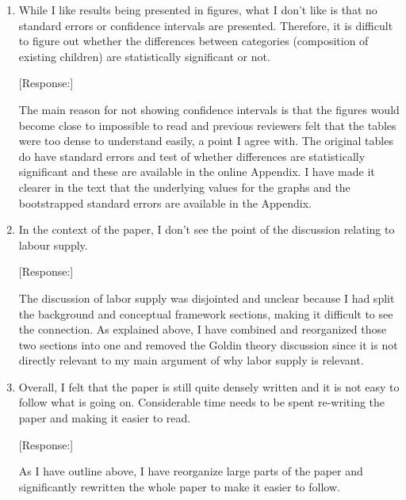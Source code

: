 \documentclass[letterpaper,12pt]{article}
\begin{document}
\begin{enumerate}
[Response:]

The 2004 break is an attempt to understand whether we are observing the beginning of
a reversal in son preference and the use of sex selection as hypothesized by part of
the prior literature.
In the ``Data'' section, I have split the paragraph on the periods into two and expanded 
the discussion of the motivation for the breaks, including adding two additional
references arguing that we might see the reversal.
Clearly, the 2004/05 break is somewhat arbitrary, but does have the advantage of making 
the periods close to the same length (there are relatively few birth intervals that begin 
in 2015 and 2016).

I now also discuss the changes between the last two papers in more detail in the 
subsection on birth spacing with sex selection and in the Conclusion.

\item While I like results being presented in figures, what I don’t like
is that no standard errors or confidence intervals are presented.
Therefore, it is difficult to figure out whether the differences between
categories (composition of existing children) are statistically
significant or not.

[Response:]

The main reason for not showing confidence intervals is that the figures would become
close to impossible to read and previous reviewers felt that the tables were too dense
to understand easily, a point I agree with.
The original tables do have standard errors and test of whether differences are 
statistically significant and these are available in the online Appendix.
I have made it clearer in the text that the underlying values for the graphs and the
bootstrapped standard errors are available in the Appendix.

\item In the context of the paper, I don’t see the point of the
discussion relating to labour supply.

[Response:]

The discussion of labor supply was disjointed and unclear because I had split the 
background and conceptual framework sections, making it difficult to see the connection.
As explained above, I have combined and reorganized those two sections into one and
removed the Goldin theory discussion since it is not directly relevant to my main
argument of why labor supply is relevant.


\item Overall, I felt that the paper is still quite densely written and
it is not easy to follow what is going on. Considerable time needs to be
spent re-writing the paper and making it easier to read.

[Response:]

As I have outline above, I have reorganize large parts of the paper and significantly
rewritten the whole paper to make it easier to follow. 


\end{enumerate}



\newpage


\end{document}
